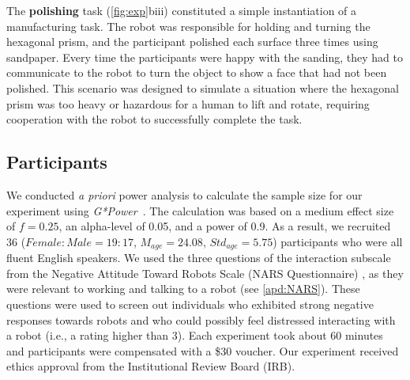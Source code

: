 The \textbf{polishing} task (\autoref{fig:exp}biii) constituted a simple instantiation of a manufacturing task. The robot was responsible for holding and turning the hexagonal prism, and the participant polished each surface three times using sandpaper. Every time the participants were happy with the sanding, they had to communicate to the robot to turn the object to show a face that had not been polished. This scenario was designed to simulate a situation where the hexagonal prism was too heavy or hazardous for a human to lift and rotate, requiring cooperation with the robot to successfully complete the task.


\subsection{Participants}
We conducted \textit{a priori} power analysis to calculate the sample size for our experiment using \textit{G*Power}~\cite{faul2007g}. The calculation was based on a medium effect size of $f=0.25$, an alpha-level of 0.05, and a power of 0.9. As a result, we recruited 36 ($Female:Male = 19:17$,  $M_{age} = 24.08$, $Std_{age} = 5.75$) participants who were all fluent English speakers. We used the three questions of the interaction subscale from the Negative Attitude Toward Robots Scale (NARS Questionnaire) \cite{nomura2006measurement}, as they were relevant to working and talking to a robot (see \autoref{apd:NARS}). These questions were used to screen out individuals who exhibited strong negative responses towards robots and who could possibly feel distressed interacting with a robot (i.e., a rating higher than 3). Each experiment took about 60 minutes and participants were compensated with a \$30 voucher. Our experiment received ethics approval from the Institutional Review Board (IRB).

